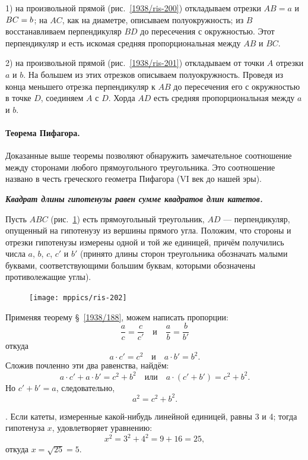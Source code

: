 \documentclass[twoside]{book}
\begin{document}
1) на произвольной прямой (рис.~\ref{1938/ris-200}) откладываем отрезки $AB=a$ и $BC\z=b$;
на $AC$, как на диаметре, описываем полуокружность;
из $B$ восстанавливаем перпендикуляр $BD$ до пересечения с окружностью.
Этот перпендикуляр и есть искомая средняя пропорциональная между $AB$ и $BC$.

2) на произвольной прямой (рис.~\ref{1938/ris-201}) откладываем от точки $A$ отрезки $a$ и $b$.
На большем из этих отрезков описываем полуокружность.
Проведя из конца меньшего отрезка перпендикуляр к $AB$ до пересечения его с окружностью в точке $D$, соединяем $A$ с $D$.
Хорда $AD$ есть средняя пропорциональная между $a$ и $b$.

\paragraph{Теорема Пифагора.}\label{1938/191}
Доказанные выше теоремы позволяют обнаружить замечательное соотношение между сторонами любого прямоугольного треугольника.
Это соотношение названо в честь греческого геометра Пифагора (VI век до нашей эры).

\textbf{\emph{Квадрат длины гипотенузы равен сумме квадратов длин катетов.}} 

Пусть $ABC$ (рис.~\ref{1938/ris-202}) есть прямоугольный треугольник, $AD$ — перпендикуляр, опущенный на гипотенузу из вершины прямого угла.
Положим, что стороны и отрезки гипотенузы измерены одной и той же единицей, причём получились числа $a$, $b$, $c$, $c'$ и $b'$ (принято длины сторон треугольника обозначать малыми буквами, соответствующими большим буквам, которыми обозначены противолежащие углы).

\begin{figure}
\centering
\texttt{[image: mppics/ris-202]}
\caption{}\label{1938/ris-202}
\end{figure}

Применяя теорему §~\ref{1938/188}, можем написать пропорции:
\[\frac ac=\frac c{c'}
\quad\text{и}\quad
\frac ab=\frac b{b'}\]
откуда 
\[a\cdot c'=c^2
\quad\text{и}\quad
a\cdot b'=b^2.\]
Сложив почленно эти два равенства, найдём:
\[a\cdot c'+a\cdot b'=c^2+b^2
\quad\text{или}\quad
a\cdot (c'+b')=c^2+b^2.\]
Но $c'+b'=a$, следовательно,
\[a^2=c^2+b^2.\]

\smallskip
{}.
Если катеты, измеренные какой-нибудь линейной единицей, равны 3 и 4; 
тогда гипотенуза  $x$, удовлетворяет уравнению:
\[x^2=3^2+4^2=9+16=25,\]
откуда $x = \sqrt{25} = 5$.
\end{document}
